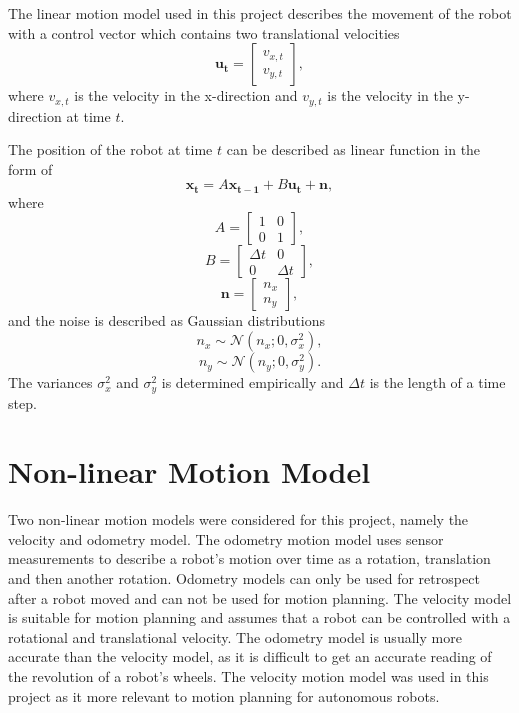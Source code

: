 \documentclass[12pt,oneside,openany,a4paper, %
afrikaans,english,
]{memoir}
\numberwithin{equation}{chapter}
\begin{document}
The linear motion model used in this project describes the movement of the robot with a control vector which contains two translational velocities
\begin{equation}
\bm{u_t} = 
\begin{bmatrix}
v_{x,t}\\
v_{y,t}
\end{bmatrix},
\end{equation}
where $v_{x,t}$ is the velocity in the x-direction and $v_{y,t}$ is the velocity in the y-direction at time $t$.

The position of the robot at time $t$ can be described as linear function in the form of
\begin{equation}
\bm{x_t} = A \bm{x_{t - 1}} + B \bm{u_t} + \bm{n},
\end{equation}
where
\begin{equation}
A =
\begin{bmatrix}
1 & 0\\
0 & 1
\end{bmatrix},
\end{equation}
\begin{equation}
B = \begin{bmatrix}
\Delta t & 0\\
0 & \Delta t
\end{bmatrix},
\end{equation}
\begin{equation}
\bm{n} =
\begin{bmatrix}
n_x\\
n_y
\end{bmatrix},
\end{equation}
and the noise is described as Gaussian distributions
\begin{equation}
n_x \sim \mathcal{N}(n_x; 0, \sigma_x^2),
\end{equation}
\begin{equation}
n_y \sim \mathcal{N}(n_y; 0, \sigma_y^2).
\end{equation}
The variances $\sigma_x^2$ and $\sigma_y^2$ is determined empirically and $\Delta t$ is the length of a time step.


\section{Non-linear Motion Model}
Two non-linear motion models were considered for this project, namely the velocity and odometry model. The odometry motion model uses sensor measurements to describe a robot's motion over time as a rotation, translation and then another rotation. Odometry models can only be used for retrospect after a robot moved and can not be used for motion planning. The velocity model is suitable for motion planning and assumes that a robot can be controlled with a rotational and translational velocity. The odometry model is usually more accurate than the velocity model, as it is difficult to get an accurate reading of the revolution of a robot's wheels. The velocity motion model was used in this project as it more relevant to motion planning for autonomous robots.
\end{document}

